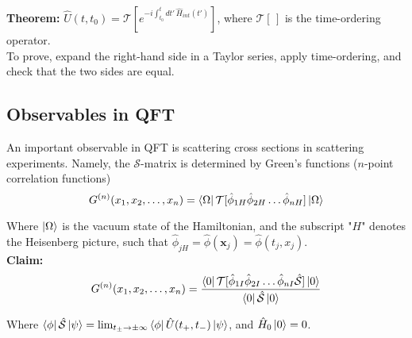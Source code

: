 \noindent \textbf{Theorem:} $\hat{U}(t,t_0) = \mathcal{T}[ e^{-i \int^t_{t_0} dt' \, \hat{H}_{int}(t')}]$, where $\mathcal{T}[\,]$ is the time-ordering operator. \\

\noindent To prove, expand the right-hand side in a Taylor series, apply time-ordering, and check that the two sides are equal. \\

\subsection*{Observables in QFT}

\noindent An important observable in QFT is scattering cross sections in scattering experiments. Namely, the $\mathcal{S}$-matrix is determined by Green's functions ($n$-point correlation functions)
\begin{equation}
G^{(n)}(x_1,x_2,\dots,x_n) = \bra{\Omega} \mathcal{T} [ \hat{\phi}_{1H} \hat{\phi}_{2H} \dots \hat{\phi}_{nH} ] \ket{\Omega}
\end{equation}

\noindent Where $\ket{\Omega}$ is the vacuum state of the Hamiltonian, and the subscript "$H$" denotes the Heisenberg picture, such that $\hat{\phi}_{jH} = \hat{\phi}(\textbf{x}_j) = \hat{\phi}(t_j,x_j)$. \\

\noindent \textbf{Claim:} 
\begin{equation}
G^{(n)}(x_1,x_2,\dots,x_n) = \frac{ \bra{0} \mathcal{T}[ \hat{\phi}_{1I} \hat{\phi}_{2I} \dots \hat{\phi}_{nI}\hat{\mathcal{S}}] \ket{0}}{\bra{0} \hat{\mathcal{S}} \ket{0}}
\end{equation}

Where $\bra{\phi}\hat{\mathcal{S}}\ket{\psi} = \lim_{t_\pm \rightarrow \pm \infty} \bra{\phi} \hat{U}(t_+, t_-) \ket{\psi}$, and $\hat{H}_0\ket{0} = 0$. \\

